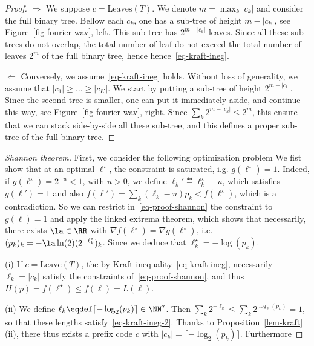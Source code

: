 \begin{proof}
	$\Rightarrow$ We suppose $c=\text{Leaves}(T)$. We denote $m=\max_k |c_k|$ and consider the full binary tree.
	Bellow each $c_k$, one has a sub-tree of height $m-|c_k|$, see Figure~\ref{fig-fourier-wav}, left. This sub-tree has $2^{m-|c_k|}$ leaves. Since all these sub-trees do not overlap, the total number of leaf do not exceed the total number of leaves $2^m$ of the full binary tree, hence
	hence~\eqref{eq-kraft-ineg}.
	

	
	$\Leftarrow$ Conversely, we assume~\eqref{eq-kraft-ineg} holds. Without loss of generality, we assume that $|c_1| \geq \ldots \geq |c_K|$. We start by putting a sub-tree of height $2^{m-|c_1|}$. Since the second tree is smaller, one can put it immediately aside, and continue this way, see Figure~\ref{fig-fourier-wav}, right. Since  $\sum_k 2^{m-|c_k|} \leq 2^m$, this ensure that we can stack side-by-side all these sub-tree, and this defines a proper sub-tree of the full binary tree. 
\end{proof}



\begin{proof}[Shannon theorem]
	First, we consider the following optimization problem
	We fist show that at an optimal $\ell^\star$, the constraint is saturated, i.g. $g(\ell^\star)=1$. Indeed, if $g(\ell^\star)=2^{-u} < 1$, with $u>0$, we define $\ell_k' \eqdef \ell_k^\star-u$, which satisfies $g(\ell') = 1$ and also $f(\ell')=\sum_k (\ell_k-u) p_k < f(\ell^\star)$, which is a contradiction.
	So we can restrict in~\eqref{eq-proof-shannon} the constraint to $g(\ell)=1$ and apply the linked extrema theorem, which shows that necessarily, there exists $\la \in \RR$ with $\nabla f(\ell^\star)=\nabla g(\ell^\star)$, i.e.  $(p_k)_k = -\la \ln(2) (2^{-\ell_k^\star})_k$. Since 
	we deduce that $\ell^\star_k = -\log(p_k)$. 
	
	(i) If $c=\text{Leave}(T)$, the by Kraft inequality~\eqref{eq-kraft-ineg}, necessarily $\ell_k=|c_k|$ satisfy the constraints of~\eqref{eq-proof-shannon}, and thus $H(p) = f(\ell^\star) \leq f(\ell) = L(\ell)$.
	
	(ii) We define $\ell_k \eqdef \lceil -\log_2(p_k) \rceil \in \NN^*$. Then $\sum_k 2^{-\ell_k} \leq \sum_k 2^{\log_2(p_k)} = 1$, so that these lengths satisfy~\eqref{eq-kraft-ineg-2}. Thanks to Proposition~\ref{lem-kraft} (ii), there thus exists a prefix code $c$ with $|c_k|=\lceil -\log_2(p_k) \rceil$. Furthermore
\end{proof}

